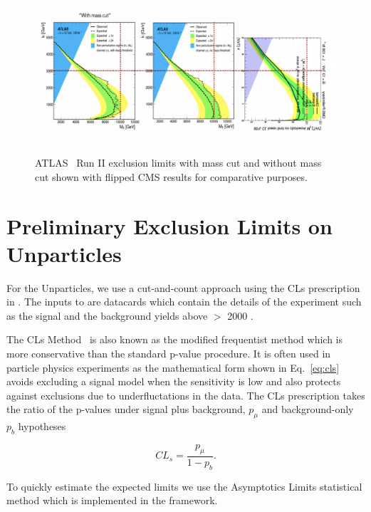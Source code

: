 \begin{figure}[!htbp]
\caption{ATLAS~\cite{ATLAS:2023hbp} Run II exclusion limits with mass cut and without mass cut shown with flipped CMS results for comparative purposes.}
\centering
\includegraphics[width=0.9\linewidth]{fig/ATLASComp.png}
\label{Fig:LIMIT_Clockwork_ATLAS}
\end{figure}


\section{Preliminary Exclusion Limits on Unparticles}

For the Unparticles, we use a cut-and-count approach using the CLs prescription in \COMBINE. The inputs to \COMBINE are datacards which contain the details of the experiment such as the signal and the background yields above \mgg $>$ 2000 \GeV. 

The CLs Method~\cite{Junk:1999kv, Read:2002hq} is also known as the modified frequentist method which is more conservative than the standard p-value procedure. It is often used in particle physics experiments as the mathematical form shown in Eq.~\ref{eq:cls} avoids excluding a signal model when the sensitivity is low and also protects against exclusions due to underfluctations in the data. The CLs prescription takes the ratio of the p-values under signal plus background, $p_\mu$ and background-only $p_b$ hypotheses

\begin{equation}
\label{eq:cls}
    CL_s = \frac{p_{\mu}}{1-p_b}.
\end{equation}

To quickly estimate the expected limits we use the Asymptotics Limits statistical method which is implemented in the \COMBINE framework. 

